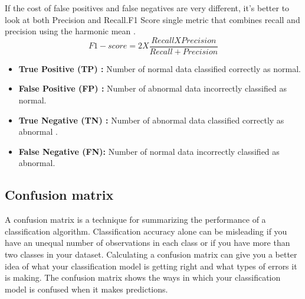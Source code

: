 If the cost of false positives and false negatives are very different, it's better to look at both Precision and Recall.F1 Score single metric that combines recall and precision using the harmonic mean \cite{w9}. \\

\textbf{\[F1-score = 2 X  \frac{ Recall X Precision}{Recall + Precision}\]}

\begin{itemize}
    \item \textbf{True Positive (TP) :} Number of normal data classified correctly as normal.
	\item \textbf{False Positive (FP) :} Number of abnormal data incorrectly  classified as normal.
	\item \textbf{True Negative (TN) :} Number of abnormal data classified correctly as abnormal .
	\item \textbf{False Negative (FN):} Number of normal data incorrectly classified as abnormal.
\end{itemize} 

\subsection{Confusion matrix}
A confusion matrix is a technique for summarizing the performance of a classification
algorithm. Classification accuracy alone can be misleading if you have an unequal
number of observations in each class or if you have more than two classes in your dataset.
Calculating a confusion matrix can give you a better idea of what your classification
model is getting right and what types of errors it is making. The confusion matrix shows
the ways in which your classification model is confused when it makes predictions.\cite{w7}


